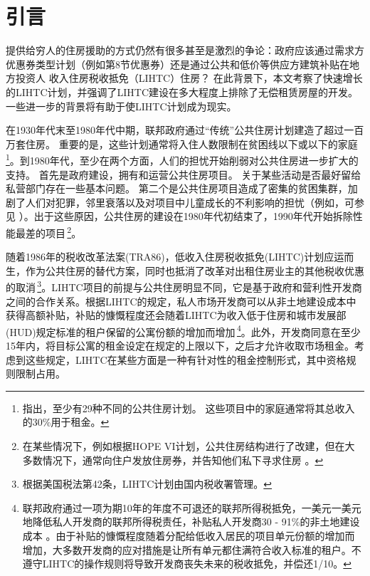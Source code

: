 \documentclass[lang=cn,11pt,a4paper]{paper}
\begin{document}
\section{引言}

提供给穷人的住房援助的方式仍然有很多甚至是激烈的争论：政府应该通过需求方优惠券类型计划（例如第8节优惠券）还是通过公共和低价等供应方建筑补贴在地方投资人 收入住房税收抵免（LIHTC）住房？ 在此背景下，本文考察了快速增长的LIHTC计划，并强调了LIHTC建设在多大程度上排除了无偿租赁房屋的开发。 一些进一步的背景将有助于使LIHTC计划成为现实。

在1930年代末至1980年代中期，联邦政府通过“传统”公共住房计划建造了超过一百万套住房。 重要的是，这些计划通常将入住人数限制在贫困线以下或以下的家庭 \citep{Olsen2003365}\,\footnote{\cite{Olsen2003365}指出，至少有29种不同的公共住房计划。 这些项目中的家庭通常将其总收入的30\%用于租金。}。到1980年代，至少在两个方面，人们的担忧开始削弱对公共住房进一步扩大的支持。 首先是政府建设，拥有和运营公共住房项目。 关于某些活动是否最好留给私营部门存在一些基本问题。 第二个是公共住房项目造成了密集的贫困集群，加剧了人们对犯罪，邻里衰落以及对项目中儿童成长的不利影响的担忧（例如，可参见 \cite{Currie200099,Jencks1990111}）。出于这些原因，公共住房的建设在1980年代初结束了，1990年代开始拆除性能最差的项目\,\footnote{在某些情况下，例如根据HOPE VI计划，公共住房结构进行了改建，但在大多数情况下，通常向住户发放住房券，并告知他们私下寻求住房 \cite{Jacob2004233}。}。

随着1986年的税收改革法案(TRA86)，低收入住房税收抵免(LIHTC)计划应运而生，作为公共住房的替代方案，同时也抵消了改革对出租住房业主的其他税收优惠的取消\citep{USCongress1987}\,\footnote{根据美国税法第42条，LIHTC计划由国内税收署管理。}。LIHTC项目的前提与公共住房明显不同，它是基于政府和营利性开发商之间的合作关系。根据LIHTC的规定，私人市场开发商可以从非土地建设成本中获得高额补贴，补贴的慷慨程度还会随着LIHTC为收入低于住房和城市发展部(HUD)规定标准的租户保留的公寓份额的增加而增加\,\footnote{联邦政府通过一项为期10年的年度不可退还的联邦所得税抵免，一美元一美元地降低私人开发商的联邦所得税责任，补贴私人开发商30 - 91\%的非土地建设成本 \cite{Eriksen2009141}。由于补贴的慷慨程度随着分配给低收入居民的项目单元份额的增加而增加，大多数开发商的应对措施是让所有单元都住满符合收入标准的租户。不遵守LIHTC的操作规则将导致开发商丧失未来的税收抵免，并偿还1/10。}。此外，开发商同意在至少15年内，将目标公寓的租金设定在规定的上限以下，之后才允许收取市场租金。考虑到这些规定，LIHTC在某些方面是一种有针对性的租金控制形式，其中资格规则限制占用。
\end{document}
